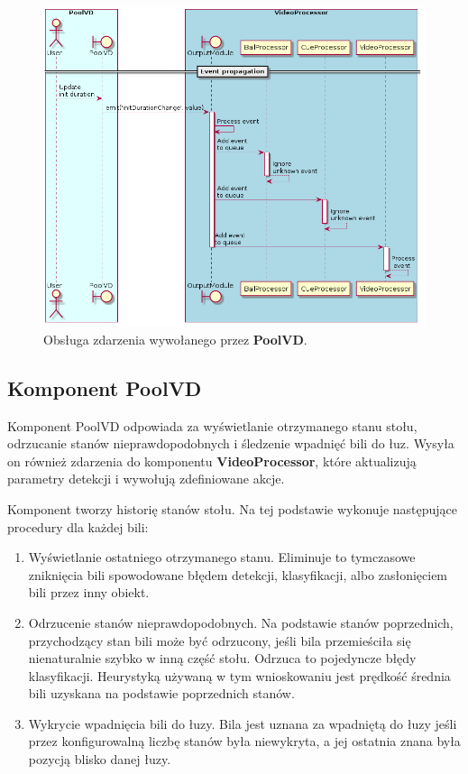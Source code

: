 \documentclass[12pt]{article}
\begin{document}
\begin{figure}[!ht]
    \centering
    \includegraphics[width=15cm]{./diagrams/out/pool_vd_events_sd.png}
    \caption{Obsługa zdarzenia wywołanego przez \textbf{PoolVD}.}
    \label{pool_vd_events_sd}
\end{figure}

\subsection{Komponent PoolVD}
Komponent PoolVD odpowiada za wyświetlanie otrzymanego stanu stołu, odrzucanie stanów nieprawdopodobnych i śledzenie wpadnięć bili do łuz. Wysyła on również zdarzenia do komponentu \textbf{VideoProcessor}, które aktualizują parametry detekcji i wywołują zdefiniowane akcje.

Komponent tworzy historię stanów stołu. Na tej podstawie wykonuje następujące procedury dla każdej bili:

\begin{enumerate} [noitemsep]
    \item Wyświetlanie ostatniego otrzymanego stanu. Eliminuje to tymczasowe zniknięcia bili spowodowane błędem detekcji, klasyfikacji, albo zasłonięciem bili przez inny obiekt.
    \item Odrzucenie stanów nieprawdopodobnych. Na podstawie stanów poprzednich, przychodzący stan bili może być odrzucony, jeśli bila przemieściła się nienaturalnie szybko w inną część stołu. Odrzuca to pojedyncze błędy klasyfikacji. Heurystyką używaną w tym wnioskowaniu jest prędkość średnia bili uzyskana na podstawie poprzednich stanów.
    \item Wykrycie wpadnięcia bili do łuzy. Bila jest uznana za wpadniętą do łuzy jeśli przez konfigurowalną liczbę stanów była niewykryta, a jej ostatnia znana była pozycją blisko danej łuzy.
\end{enumerate}
\end{document}
